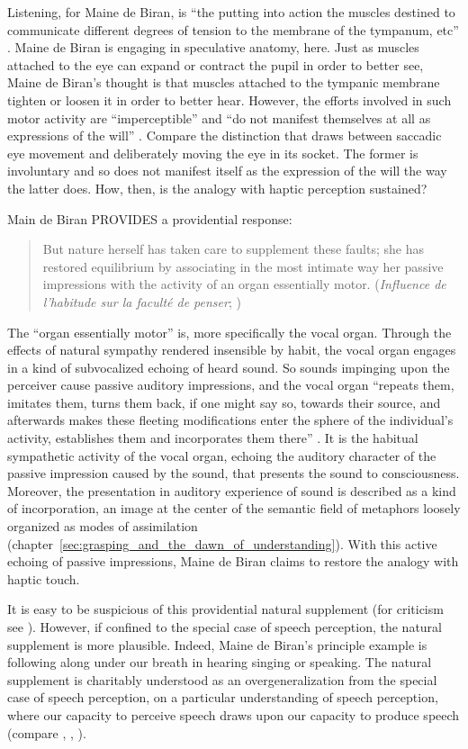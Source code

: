 Listening, for Maine de Biran, is ``the putting into action the muscles destined to communicate different degrees of tension to the membrane of the tympanum, etc'' \citep[64]{Boehm:1929aa}. Maine de Biran is engaging in speculative anatomy, here. Just as muscles attached to the eye can expand or contract the pupil in order to better see, Maine de Biran's thought is that muscles attached to the tympanic membrane tighten or loosen it in order to better hear. However, the efforts involved in such motor activity are ``imperceptible'' and ``do not manifest themselves at all as expressions of the will'' \citep[64]{Boehm:1929aa}. Compare the distinction that \citet[]{Smith:2002sa} draws between saccadic eye movement and deliberately moving the eye in its socket. The former is involuntary and so does not manifest itself as the expression of the will the way the latter does. How, then, is the analogy with haptic perception sustained? 

Main de Biran PROVIDES a providential response:
\begin{quote}
	But nature herself has taken care to supplement these faults; she has restored equilibrium by associating in the most intimate way her passive impressions with the activity of an organ essentially motor. (\emph{Influence de l'habitude sur la faculté de penser}; \citealt[63--4]{Boehm:1929aa})
\end{quote}
The ``organ essentially motor'' is, more specifically the vocal organ. Through the effects of natural sympathy rendered insensible by habit, the vocal organ engages in a kind of subvocalized echoing of heard sound. So sounds impinging upon the perceiver cause passive auditory impressions, and the vocal organ ``repeats them, imitates them, turns them back, if one might say so, towards their source, and afterwards makes these fleeting modifications enter the sphere of the individual's activity, establishes them and incorporates them there'' \citep[64]{Boehm:1929aa}. It is the habitual sympathetic activity of the vocal organ, echoing the auditory character of the passive impression caused by the sound, that presents the sound to consciousness. Moreover, the presentation in auditory experience of sound is described as a kind of incorporation, an image at the center of the semantic field of metaphors loosely organized as modes of assimilation (chapter~\ref{sec:grasping_and_the_dawn_of_understanding}). With this active echoing of passive impressions, Maine de Biran claims to restore the analogy with haptic touch.

It is easy to be suspicious of this providential natural supplement (for criticism see \citealt[chapter 7]{Derrida:2005aa}). However, if confined to the special case of speech perception, the natural supplement is more plausible. Indeed, Maine de Biran's principle example is following along under our breath in hearing singing or speaking. The natural supplement is charitably understood as an overgeneralization from the special case of speech perception, on a particular understanding of speech perception, where our capacity to perceive speech draws upon our capacity to produce speech (compare \citealt[chapter 2]{Bergson:1912pi}, \citealt{Liberman:1985ty}, \citealt{Mole:2009hl}). 


